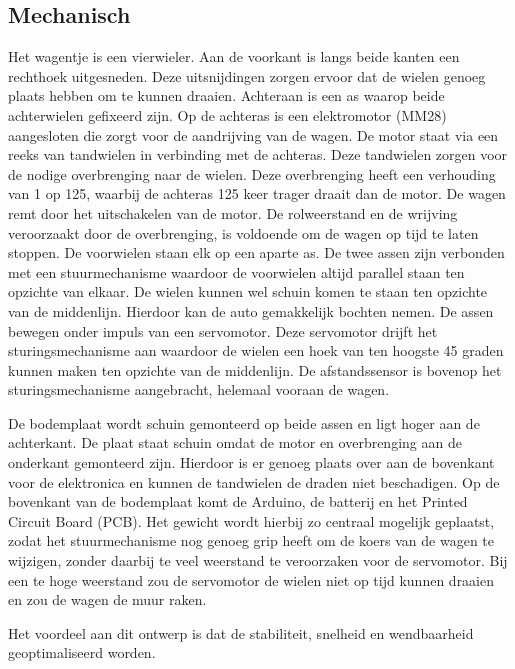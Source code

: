  
\subsection{Mechanisch}
Het wagentje is een vierwieler. Aan de voorkant is langs beide kanten een 
rechthoek uitgesneden. Deze uitsnijdingen zorgen ervoor dat de wielen genoeg 
plaats hebben om te kunnen draaien. Achteraan is een as waarop beide 
achterwielen gefixeerd zijn. 
Op de achteras is een elektromotor (MM28) aangesloten die zorgt voor de 
aandrijving van de wagen. De motor staat via een reeks van tandwielen in 
verbinding met de achteras. Deze tandwielen zorgen voor de nodige overbrenging 
naar de wielen. Deze overbrenging heeft een verhouding van 1 op 125, waarbij de 
achteras 125 keer trager draait dan de motor.  De wagen remt door het 
uitschakelen van de motor. De rolweerstand en de wrijving veroorzaakt door de 
overbrenging, is voldoende om de wagen op tijd te laten stoppen.
De voorwielen staan elk op een aparte as. De twee assen zijn verbonden met een 
stuurmechanisme waardoor de voorwielen altijd parallel staan ten opzichte van 
elkaar. De wielen kunnen wel schuin komen te staan ten opzichte van de 
middenlijn. Hierdoor kan de auto gemakkelijk bochten nemen. De assen bewegen 
onder impuls van een servomotor. Deze servomotor drijft het sturingsmechanisme 
aan waardoor de wielen een hoek van ten hoogste 45 graden kunnen maken ten 
opzichte van de middenlijn. De afstandssensor is bovenop het sturingsmechanisme 
aangebracht, helemaal vooraan de wagen.

De bodemplaat wordt schuin gemonteerd op beide assen en ligt hoger aan de 
achterkant. De plaat staat schuin omdat de motor en overbrenging aan de 
onderkant gemonteerd zijn. Hierdoor is er genoeg plaats over aan de bovenkant 
voor de elektronica en kunnen de tandwielen de draden niet beschadigen. 
Op de bovenkant van de bodemplaat komt de Arduino, de batterij en het Printed 
Circuit Board (PCB). Het gewicht wordt hierbij zo centraal mogelijk geplaatst, 
zodat het stuurmechanisme nog genoeg grip heeft om de koers van de wagen te 
wijzigen, zonder daarbij te veel weerstand te veroorzaken voor de servomotor. 
Bij een te hoge weerstand zou de servomotor de wielen niet op tijd kunnen 
draaien en zou de wagen de muur raken.

Het voordeel aan dit ontwerp is dat de stabiliteit, snelheid en wendbaarheid 
geoptimaliseerd worden. 
